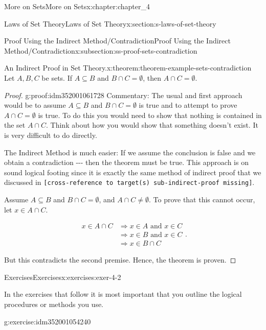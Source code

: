 \documentclass[oneside,10pt,]{book}
\newcommand{\mono}[1]{\texttt{#1}}
\begin{document}
\begin{chapterptx}{More on Sets}{}{More on Sets}{}{}{x:chapter:chapter_4}
\begin{sectionptx}{Laws of Set Theory}{}{Laws of Set Theory}{}{}{x:section:s-laws-of-set-theory}
\begin{subsectionptx}{Proof Using the Indirect Method\slash{}Contradiction}{}{Proof Using the Indirect Method\slash{}Contradiction}{}{}{x:subsection:ss-proof-sets-contradiction}
\begin{theorem}{An Indirect Proof in Set Theory.}{}{x:theorem:theorem-example-sets-contradiction}
Let \(A, B, C\) be sets. If \(A\subseteq B\) and \(B\cap C = \emptyset\), then \(A\cap C = \emptyset\).%
\end{theorem}
\begin{proof}{}{g:proof:idm352001061728}
Commentary: The usual and first approach would be to assume \(A\subseteq B\) and \(B\cap C = \emptyset\) is true and to attempt to prove \(A\cap C = \emptyset\) is true. To do this you would need to show that nothing is contained in the set \(A \cap  C\). Think about how you would show that something doesn't exist. It is very difficult to do directly.%
\par
The Indirect Method is much easier: If we assume the conclusion is false and we obtain a contradiction -{}-{}-  then the theorem must be true. This approach is on sound logical footing since it is exactly the same method of indirect proof that we discussed in \mono{[cross-reference to target(s) \textquotedbl{}sub-indirect-proof\textquotedbl{} missing]}.%
\par
Assume \(A\subseteq B\) and \(B\cap C = \emptyset\), and \(A\cap C \neq  \emptyset\). To prove that this cannot occur, let \(x\in A \cap C\).%
\par
%
\begin{equation*}
\begin{split}
x \in A \cap C & \Rightarrow x \in A \textrm{ and } x \in  C\\
& \Rightarrow x \in B \textrm{ and } x \in  C\\
& \Rightarrow x \in  B \cap C
\end{split}\text{.}
\end{equation*}
%
\par
But this contradicts the second premise.  Hence, the theorem is proven.%
\end{proof}
\end{subsectionptx}
%
%
\typeout{************************************************}
\typeout{************************************************}
%
\begin{exercises-subsection}{Exercises}{}{Exercises}{}{}{x:exercises:exer-4-2}
\begin{introduction}{}%
In the exercises that follow it is most important that you outline the logical procedures or methods you use.%
\end{introduction}%
\begin{divisionexercise}{1}{}{}{g:exercise:idm352001054240}%
%
\begin{enumerate}[label=(\alph*)]

\end{enumerate}
\end{divisionexercise}
\end{exercises-subsection}
\end{sectionptx}
\end{chapterptx}
\end{document}
